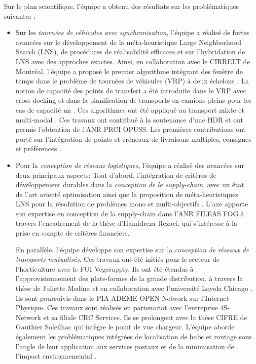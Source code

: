 Sur le plan scientifique, l'équipe a obtenu des résultats sur les problématiques suivantes : 
\begin{itemize}
	\item Sur les \textit{tournées de véhicules avec synchronisation}, l'équipe a réalisé de fortes avancées sur le développement de la méta-heuristique Large Neighborhood Search (LNS), de procédures de réalisabilité efficaces et sur l'hybridation de LNS avec des approches exactes. Ainsi, en collaboration avec le CIRRELT de Montréal, l'équipe a proposé le premier algorithme intégrant des fenêtre de temps dans le problème de tournées de véhicules (VRP) à deux échelons \cite{grangier2015}. La notion de capacité des points de transfert a été introduite dans le VRP avec cross-docking \cite{grangier:hal-01499170,grangier:hal-02277261} et dans la planification de transports en camions pleins pour les cas de capacité un \cite{grimault:hal-01543503,grimault:tel-01343199}. Ces algorithmes ont été appliqué au transport mixte et multi-modal \cite{masson:hal-01068305}.
	Ces travaux ont contribué à la soutenance d'une HDR \cite{lehuede:tel-01441778} et ont permis l'obtention de l'ANR PRCI OPUSS. Les premières contributions ont porté sur l'intégration de points et créneaux de livraisons multiples, consignes et préférences  \cite{dumez:hal-02452252}.
	\item Pour la \textit{conception de réseaux logistiques}, l'équipe a réalisé des avancées sur deux principaux aspects: Tout d'abord, l'intégration de critères de développement durables dans la \textit{conception de la supply-chain}, avec un état de l'art orienté optimisation \cite{eskandarpour:hal-01154605} ainsi que la proposition de méta-heuristiques LNS pour la résolution de problèmes mono et multi-objectifs \cite{eskandarpour:hal-01433630, eskandarpour:hal-02407741}.
	L'axe apporte son expertise en conception de la supply-chain dans l'ANR FILEAS FOG à travers l'encadrement de la thèse d'Hamidreza Rezaei, qui s'intéresse à la prise en compte de critères financiers.

    En parallèle, l'équipe développe son expertise sur la \textit{conception de réseaux de transports mutualisés}. Ces travaux ont été initiés pour le secteur de l'horticulture \cite{tang:hal-01591618} avec le FUI Vegesupply. Ils ont été étendus à l'approvisionnement des plate-formes de la grande distribution, à travers la thèse de Juliette Medina \cite{medina:tel-01460708} et en collaboration avec l'université Loyola Chicago \cite{medina:hal-01689718}. Ils sont poursuivis dans le PIA ADEME OPEN Network sur l'Internet Physique. Ces travaux sont réalisés en partenariat avec l'entreprise 4S-Network et sa filiale CRC Services. Ils se prolongent avec la thèse CIFRE de Gauthier Soleilhac qui intègre le point de vue chargeur. 
    L'équipe aborde également les problématiques intégrées de localisation de hubs et routage sous l'angle de leur application aux services postaux \cite{bostel:hal-01320357,yang:hal-02524875} et de la minimisation de l'impact environnemental \cite{yang:these}.
    

\end{itemize}
